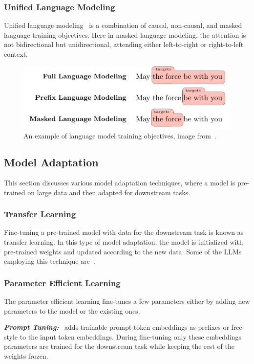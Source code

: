 \subsubsection{Unified Language Modeling}
Unified language modeling~\cite{Unified_LM} is a combination of causal, non-causal, and masked language training objectives. Here in masked language modeling, the attention is not bidirectional but unidirectional, attending either left-to-right or right-to-left context.
\begin{figure}[tbp]
\centering
\includegraphics[width=1\columnwidth]{Figure/training_objectives.png}
\caption{An example of language model training objectives, image from~\cite{LLM_Objectives}.}
\label{t_objectives}
\end{figure}

\subsection{Model Adaptation}
This section discusses various model adaptation techniques, where a model is pre-trained on large data and then adapted for downstream tasks. 

\subsubsection{Transfer Learning}
Fine-tuning a pre-trained model with data for the downstream task is known as transfer learning. In this type of model adaptation, the model is initialized with pre-trained weights and updated according to the new data. Some of the LLMs employing this technique are~\cite{T5, mT5, UL2, U-PaLM}. 

\subsubsection{Parameter Efficient Learning}
The parameter efficient learning fine-tunes a few parameters either by adding new parameters to the model or the existing ones. 

\vspace{1mm}
\noindent
\emph{\textbf{Prompt Tuning:}}~\cite{Prompt_Tuning, Prompt_Tuning_2} adds trainable prompt token embeddings as prefixes or free-style to the input token embeddings. During fine-tuning only these embeddings parameters are trained for the downstream task while keeping the rest of the weights frozen.


